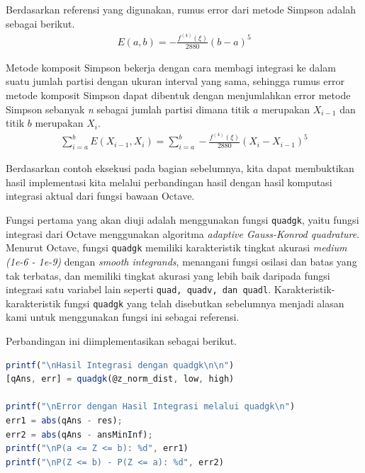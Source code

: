 \documentclass[journal,12pt,onecolumn,a4paper]{IEEEtran}
\begin{document}
Berdasarkan referensi yang digunakan, rumus error dari metode Simpson adalah sebagai berikut.
\begin{equation*}
	\begin{split}
		E(a,b) = -\frac{f^{(4)}(\xi)}{2880}(b-a)^{5}
	\end{split}
\end{equation*}

Metode komposit Simpson bekerja dengan cara membagi integrasi ke dalam suatu jumlah partisi dengan ukuran interval yang sama, sehingga rumus error metode komposit Simpson dapat dibentuk dengan menjumlahkan error metode Simpson sebanyak \emph{n} sebagai jumlah partisi dimana titik \(a\) merupakan \(X_{i-1}\) dan titik \(b\) merupakan \(X_{i}\).
\begin{equation*}
	\begin{split}
		\sum_{i=a}^{b}E(X_{i-1},X_{i}) = \sum_{i=a}^{b}-\frac{f^{(4)}(\xi)}{2880}(X_{i}-X_{i-1})^{5}
	\end{split}
\end{equation*}

Berdasarkan contoh eksekusi pada bagian sebelumnya, kita dapat membuktikan hasil implementasi kita melalui perbandingan hasil dengan hasil komputasi integrasi aktual dari fungsi bawaan Octave.

Fungsi pertama yang akan diuji adalah menggunakan fungsi \lstinline{quadgk}, yaitu fungsi integrasi dari Octave menggunakan algoritma \emph{adaptive Gauss-Konrod quadrature}. Menurut Octave, fungsi \lstinline{quadgk} memiliki karakteristik tingkat akurasi \emph{medium (1e-6 - 1e-9)} dengan \emph{smooth integrands}, menangani fungsi osilasi dan batas yang tak terbatas, dan memiliki tingkat akurasi yang lebih baik daripada fungsi integrasi satu variabel lain seperti \lstinline{quad, quadv, dan quadl}. Karakteristik-karakteristik fungsi \lstinline{quadgk} yang telah disebutkan sebelumnya menjadi alasan kami untuk menggunakan fungsi ini sebagai referensi.

Perbandingan ini diimplementasikan sebagai berikut.

\begin{center}
	\begin{lstlisting}[language=Octave]
printf("\nHasil Integrasi dengan quadgk\n\n")
[qAns, err] = quadgk(@z_norm_dist, low, high)
		
printf("\nError dengan Hasil Integrasi melalui quadgk\n")
err1 = abs(qAns - res);
err2 = abs(qAns - ansMinInf);
printf("\nP(a <= Z <= b): %d", err1)
printf("\nP(Z <= b) - P(Z <= a): %d", err2)
	\end{lstlisting}
\end{center}
\end{document}
